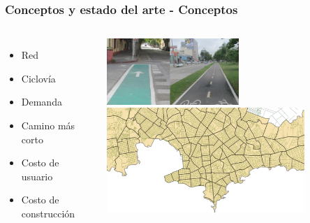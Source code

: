 \documentclass[aspectratio=43, 10pt]{beamer}
\begin{document}
\begin{frame}
    \frametitle{Conceptos y estado del arte - Conceptos}

    \begin{columns}[c]
            \begin{itemize}
            \item{Red}
            \item{Ciclovía}
            \item{Demanda}
            \item{Camino más corto}
            \item{Costo de usuario}
            \item{Costo de construcción}
            \end{itemize}
            \includegraphics[height=2.5cm,width=\textwidth]{images/ciclovias.png}
            \includegraphics[height=4cm,width=\textwidth]{images/mvd_original.png}
    \end{columns}
\end{frame}

\end{document}
